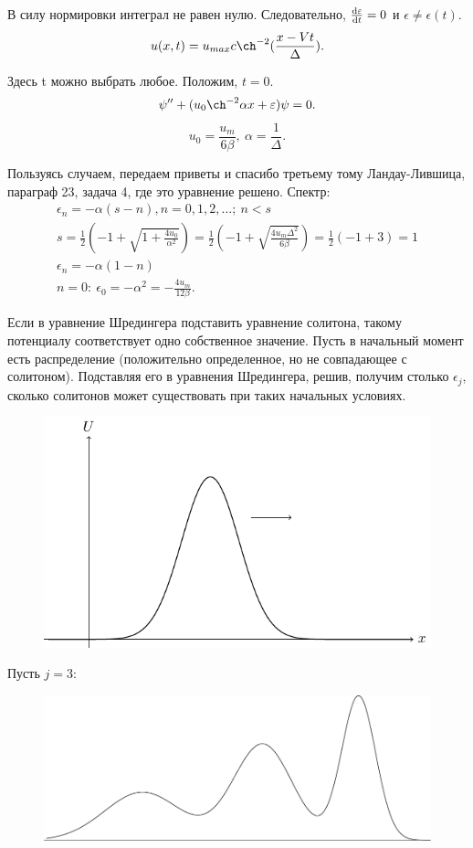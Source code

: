 В силу нормировки интеграл не равен нулю. Следовательно, $\dv{\varepsilon}{t}=0$ и $\epsilon\neq \epsilon(t)$.
\begin{equation*}
	u(x,t)=u_{max}c\ch^{-2}(\frac{x-Vt}{\Delta}).
\end{equation*}

Здесь t можно выбрать любое. Положим, $t=0$.
\begin{equation}
	\psi''+(u_0 \ch^{-2}\alpha x+\epsilon)\psi=0.
	\label{eq::s312}
\end{equation}
\begin{equation*}
	u_0=\frac{u_m}{6\beta},~\alpha=\frac1{\Delta}.
\end{equation*}

Пользуясь случаем, передаем приветы и спасибо третьему тому Ландау-Лившица, параграф 23, задача 4, где это уравнение решено. Спектр:
\begin{gather*}
	\epsilon_n=-\alpha(s-n), n=0,1,2,\dots;~n<s \\ s=\frac12(-1+\sqrt{1+\frac{4u_0}{\alpha^2}})=\frac12(-1+\sqrt{\frac{4u_m\Delta^2}{6\beta}})=\frac12(-1+3)=1 \\ \epsilon_n=-\alpha(1-n) \\ n=0:~ \epsilon_0=-\alpha^2=-\frac{4u_m}{12\beta}.
\end{gather*}

Если в уравнение Шредингера подставить уравнение солитона, такому потенциалу соответствует одно собственное значение. Пусть в начальный момент есть распределение (положительно определенное, но не совпадающее с солитоном). Подставляя его в уравнения Шредингера, решив, получим столько $\epsilon_j$, сколько солитонов может существовать при таких начальных условиях.
\begin{figure}[H]
	\centering
	\includegraphics[width=0.4\linewidth]{fig/fig25.pdf}   
\end{figure}

Пусть $j=3$:
\begin{figure}[H]
	\centering
	\includegraphics[width=0.4\linewidth]{fig/fig26.pdf}   
\end{figure}


